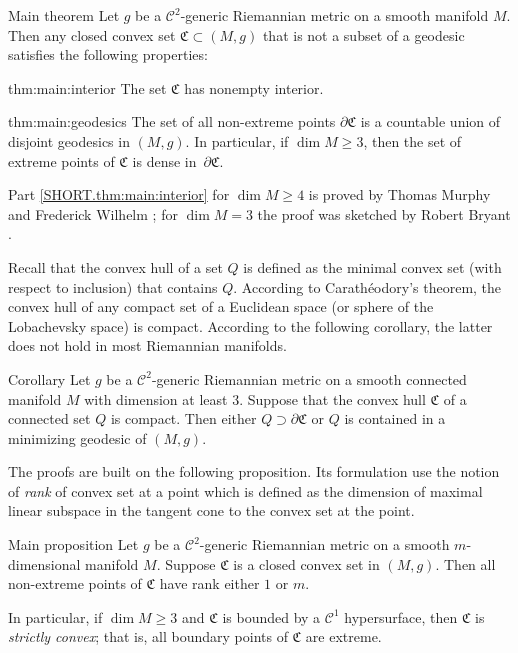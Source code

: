 \documentclass[a4paper,10pt]{article}
\begin{document}
\begin{thm}{Main theorem}\label{thm:main}
Let $g$ be a $\mathcal C^2$-generic Riemannian metric on a smooth manifold $M$.
Then any closed convex set $\mathfrak{C}\subset (M,g)$ that is not a subset of a geodesic
satisfies the following properties:

\begin{subthm}{thm:main:interior}
The set $\mathfrak{C}$ has nonempty interior.
\end{subthm}

\begin{subthm}{thm:main:geodesics}
The set of all non-extreme points $\partial\mathfrak{C}$ is a countable union of disjoint geodesics in $(M,g)$.
In particular, if $\dim M\ge 3$, then the set of
extreme points of $\mathfrak{C}$ is dense in~$\partial\mathfrak{C}$.
\end{subthm}

\end{thm}

Part \ref{SHORT.thm:main:interior} for $\dim M\ge 4$ is proved by Thomas Murphy and Frederick Wilhelm \cite{Wilhelm};
for $\dim M=3$ the proof was sketched by Robert Bryant \cite{Bryant}.

Recall that the convex hull of a set $Q$ is defined as the minimal convex set (with respect to inclusion) that contains $Q$.
 {\color{red} According to Carathéodory's theorem, the convex hull of  any compact set of a Euclidean space (or sphere of the Lobachevsky space) is compact.}
According to the following corollary, the latter does not hold in most Riemannian manifolds.

\begin{thm}{Corollary}\label{cor:caratheodory}
Let $g$ be a $\mathcal C^2$-generic Riemannian metric on a smooth connected manifold $M$ with dimension at least 3.
Suppose that the convex hull $\mathfrak{C}$ of a connected set $Q$ is compact.
Then either $Q\supset \partial \mathfrak{C}$ or $Q$ is contained in a minimizing geodesic of $(M,g)$.
\end{thm}

The proofs are built on the following proposition.
Its formulation use the notion of \emph{rank} of convex set at a point which is defined as the dimension of maximal linear subspace in the tangent cone to the convex set at the point.

\begin{thm}{Main proposition}\label{prom:rank}
Let $g$ be a $\mathcal C^2$-generic Riemannian metric on a smooth $m$-dimensional manifold $M$.
Suppose $\mathfrak{C}$ is a closed convex set in $(M,g)$.
Then all non-extreme points of $\mathfrak{C}$ have rank either $1$ or $m$.

In particular, if $\dim M\ge 3$ and $\mathfrak{C}$ is bounded by a {\color{red} $\mathcal{C}^1$ hypersurface, then $\mathfrak{C}$} is \emph{strictly convex}; that is, all boundary points of $\mathfrak{C}$ are extreme.
\end{thm}
\end{document}
